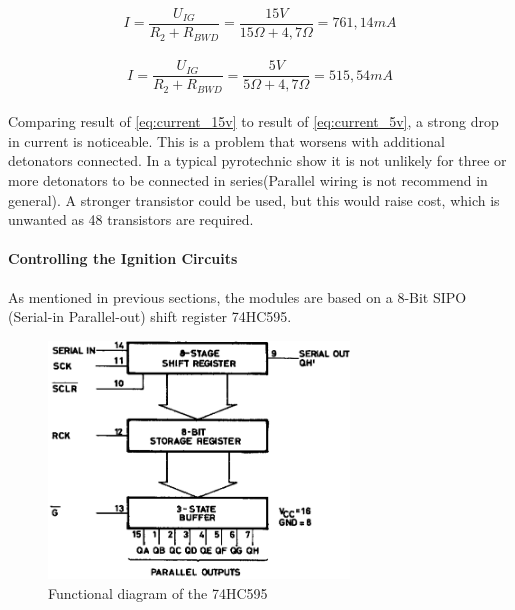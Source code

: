 \begin{equation}
I=\frac{U_{IG}}{R_2+R_{BWD}}=\frac{15V}{15\Omega+4,7\Omega}= 761,14mA
\label{eq:current_15v}
\end{equation}\\
\begin{equation}
I=\frac{U_{IG}}{R_2+R_{BWD}}=\frac{5V}{5\Omega+4,7\Omega}= 515,54mA
\label{eq:current_5v}
\end{equation}\\

\noindent Comparing result of \cref{eq:current_15v} to result of \cref{eq:current_5v}, a strong drop in current is noticeable. This is a problem that worsens with additional detonators connected. In a typical pyrotechnic show it is not unlikely for three or more detonators to be connected in series(Parallel wiring is not recommend in general). A stronger transistor could be used, but this would raise cost, which is unwanted as 48 transistors are required.\\

\pagebreak

\paragraph{Controlling the Ignition Circuits}
As mentioned in previous sections, the modules are based on a 8-Bit SIPO (Serial-in Parallel-out) shift register 74HC595. 

\begin{figure}[!ht]
    \centering
    \includegraphics[width=8cm]{./Figures/75hc595_functional.png}
    \caption{Functional diagram of the 74HC595}
    \label{fig:75hc595}     
\end{figure}


